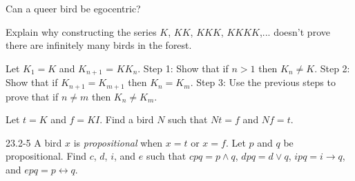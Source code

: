 \documentclass[12pt, letterpaper]{article}
\begin{document}
\begin{prob}{22.17} 
Can a queer bird be egocentric?
\end{prob}

\begin{prob}{22.18} 
Explain why constructing the series $K$, $KK$, $KKK$, $KKKK$,... doesn't prove there are infinitely many birds in the forest.
\end{prob}

\begin{prob}{22.19}
Let $K_1 = K$ and $K_{n+1}$ = $KK_n$. Step 1: Show that if $n > 1$ then $K_n \neq K$. Step 2: Show that if $K_{n+1} = K_{m+1}$ then $K_n = K_m$. Step 3: Use the previous steps to prove that if $n \neq m$ then $K_n \neq K_m$.
\end{prob}

\begin{prob}{23.1}
Let $t = K$ and $f = KI$. Find a bird $N$ such that $Nt = f$ and $Nf = t$.
\end{prob}

\begin{prob}{23.2-5}
A bird $x$ is \emph{propositional} when $x = t$ or $x = f$. Let $p$ and $q$ be propositional. Find $c$, $d$, $i$, and $e$ such that $cpq = p \wedge q$, $dpq = d \vee q$, $ipq = i \to q$, and $epq = p \leftrightarrow q$.
\end{prob}
\end{document}
